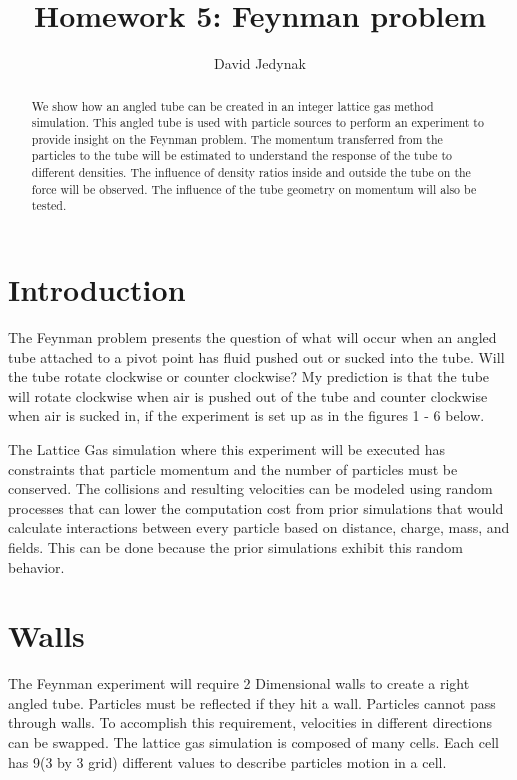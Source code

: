 \documentclass{article}
\begin{document}
\lstset{language=C} 
\title{Homework 5: Feynman problem}
\author{David Jedynak}
\maketitle
\begin{abstract}
 We show how an angled tube can be created in an integer lattice gas method simulation. This angled tube is used with particle sources to perform an experiment to provide insight on the Feynman problem. The momentum transferred from the particles to the tube will be estimated to understand the response of the tube to different densities. The influence of density ratios inside and outside the tube on the force will be observed. The influence of the tube geometry on momentum will also be tested.
\end{abstract}

\section{Introduction}
The Feynman problem presents the question of what will occur when an angled tube attached to a pivot point has fluid pushed out or sucked into the tube. Will the tube rotate clockwise or counter clockwise? My prediction is that the tube will rotate clockwise when air is pushed out of the tube and counter clockwise when air is sucked in, if the experiment is set up as in the figures 1 - 6 below.\newline



The Lattice Gas simulation where this experiment will be executed has constraints that particle momentum and the number of particles must be conserved. The collisions and resulting velocities can be modeled using random processes that can lower the computation cost from prior simulations that would calculate interactions between every particle based on distance, charge, mass, and fields. This can be done because the prior simulations exhibit this random behavior.\newline


\section{Walls}
The Feynman experiment will require 2 Dimensional walls to create a right angled tube. Particles must be reflected if they hit a wall. Particles cannot pass through walls. To accomplish this requirement, velocities in different directions can be swapped. The lattice gas simulation is composed of many cells. Each cell has 9(3 by 3 grid) different values to describe particles motion in a cell.\newline
\end{document}
